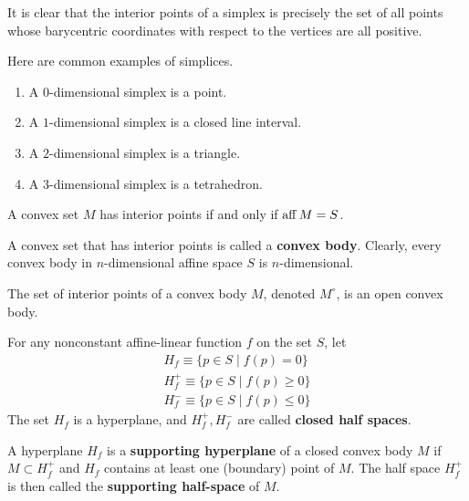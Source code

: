   It is clear that the interior points of a simplex is precisely the set of all points whose barycentric coordinates with respect to the vertices are all positive. 

  \begin{example}
    Here are common examples of simplices.
    \begin{enumerate}
      \item A $0$-dimensional simplex is a point. 
      \item A $1$-dimensional simplex is a closed line interval. 
      \item A $2$-dimensional simplex is a triangle. 
      \item A $3$-dimensional simplex is a tetrahedron. 
    \end{enumerate}
  \end{example}

  \begin{theorem}
    A convex set $M$ has interior points if and only if $\operatorname{aff} M = S$. 
  \end{theorem}

  \begin{definition}
    A convex set that has interior points is called a \textbf{convex body}. Clearly, every convex body in $n$-dimensional affine space $S$ is $n$-dimensional. 
  \end{definition}

  The set of interior points of a convex body $M$, denoted $M^\circ$, is an open convex body. 

  \begin{definition}
    For any nonconstant affine-linear function $f$ on the set $S$, let
    \begin{align*}
      H_f \equiv \{p \in S \;|\; f(p) = 0\} \\
      H^+_f \equiv \{p \in S \;|\; f(p) \geq 0\} \\
      H^-_f \equiv \{p \in S \;|\; f(p) \leq 0\}
    \end{align*}
    The set $H_f$ is a hyperplane, and $H^+_f, H^-_f$ are called \textbf{closed half spaces}. 
  \end{definition}

  \begin{definition}
    A hyperplane $H_f$ is a \textbf{supporting hyperplane} of a closed convex body $M$ if $M \subset H^+_f$ and $H_f$ contains at least one (boundary) point of $M$. The half space $H^+_f$ is then called the \textbf{supporting half-space} of $M$. 
  \end{definition}

